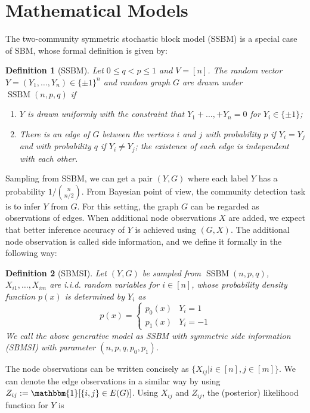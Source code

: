 \documentclass[conference]{IEEEtran}
\newtheorem{definition}{Definition}
\DeclareMathOperator{\SSBM}{SSBM}
\begin{document}
\section{Mathematical Models}\label{s:model}
The two-community symmetric stochastic block model (SSBM) is a special case of SBM, whose formal definition is given by:
\begin{definition}[SSBM]
	Let $0\leq q<p\leq 1$ and $V=[n]$. The random vector $Y=(Y_1,\dots,Y_n)\in \{\pm 1\}^n$ and random graph $G$ are drawn under $\SSBM(n,p,q)$ if
	\begin{enumerate}
		\item $Y$ is drawn uniformly with the constraint that $Y_1 + \dots, + Y_n = 0$ for $Y_i \in \{\pm 1 \}$;
		
		\item There is an edge of $G$ between the vertices $i$ and $j$ with probability $p$ if $Y_i=Y_j$ and with probability $q$ if $Y_i \neq Y_j$; the existence of each edge is independent with each other.
	\end{enumerate}
\end{definition}
Sampling from SSBM, we can get a pair $(Y,G)$ where each label $Y$ has a probability $ 1/ \binom{n}{n/2}$.
From Bayesian point of view, the community detection task is to infer $Y$ from $G$.
For this setting, the graph $G$ can be regarded as observations of edges. When
additional node observations $X$ are added, we expect that better inference accuracy of $Y$ is achieved using $(G,X)$.
The additional node observation is called side information, and we define it formally in the following way:
\begin{definition}[SBMSI]
	Let $(Y,G)$ be sampled from $\SSBM(n,p,q)$, $X_{i1}, \dots, X_{im}$ are i.i.d. random variables for $i \in [n]$,
	whose probability density function $p(x)$ is determined by $Y_i$ as
	\begin{equation}
	p(x) = \begin{cases}
	p_0(x) & Y_i = 1 \\
	p_1(x) & Y_i = -1
	\end{cases}
	\end{equation}
	We call the above generative model as SSBM with symmetric side information (SBMSI) with parameter $(n,p,q,p_0,p_1)$.
\end{definition}
The node observations can be written concisely as $\{X_{ij} | i \in [n], j \in [m]\}$.
We can denote the edge observations in a similar way by using $Z_{ij}:=\mathbbm{1}[\{i,j\} \in E(G)]$.
Using $X_{ij}$ and $Z_{ij}$, the (posterior) likelihood function for $Y$ is
\end{document}
